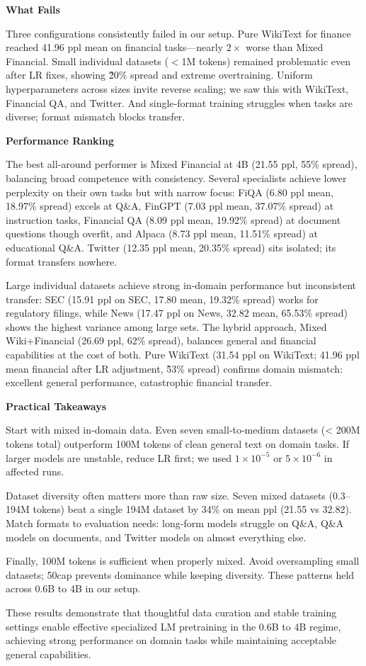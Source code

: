 \textbf{What Fails}

Three configurations consistently failed in our setup. Pure WikiText for finance reached 41.96 ppl mean on financial tasks—nearly $2\times$ worse than Mixed Financial. Small individual datasets ($<$1M tokens) remained problematic even after LR fixes, showing \~20\% spread and extreme overtraining. Uniform hyperparameters across sizes invite reverse scaling; we saw this with WikiText, Financial QA, and Twitter. And single‑format training struggles when tasks are diverse; format mismatch blocks transfer.

\textbf{Performance Ranking}

The best all‑around performer is Mixed Financial at 4B (21.55 ppl, 55\% spread), balancing broad competence with consistency. Several specialists achieve lower perplexity on their own tasks but with narrow focus: FiQA (6.80 ppl mean, 18.97\% spread) excels at Q\&A, FinGPT (7.03 ppl mean, 37.07\% spread) at instruction tasks, Financial QA (8.09 ppl mean, 19.92\% spread) at document questions though overfit, and Alpaca (8.73 ppl mean, 11.51\% spread) at educational Q\&A. Twitter (12.35 ppl mean, 20.35\% spread) sits isolated; its format transfers nowhere.

Large individual datasets achieve strong in‑domain performance but inconsistent transfer: SEC (15.91 ppl on SEC, 17.80 mean, 19.32\% spread) works for regulatory filings, while News (17.47 ppl on News, 32.82 mean, 65.53\% spread) shows the highest variance among large sets. The hybrid approach, Mixed Wiki+Financial (26.69 ppl, 62\% spread), balances general and financial capabilities at the cost of both. Pure WikiText (31.54 ppl on WikiText; 41.96 ppl mean financial after LR adjustment, \~53\% spread) confirms domain mismatch: excellent general performance, catastrophic financial transfer.

\textbf{Practical Takeaways}

Start with mixed in‑domain data. Even seven small‑to‑medium datasets (< 200M tokens total) outperform 100M tokens of clean general text on domain tasks. If larger models are unstable, reduce LR first; we used $1\times10^{-5}$ or $5\times10^{-6}$ in affected runs.

Dataset diversity often matters more than raw size. Seven mixed datasets (0.3–194M tokens) beat a single 194M dataset by 34\% on mean ppl (21.55 vs 32.82). Match formats to evaluation needs: long‑form models struggle on Q\&A, Q\&A models on documents, and Twitter models on almost everything else.

Finally, 100M tokens is sufficient when properly mixed. Avoid oversampling small datasets; 50cap prevents dominance while keeping diversity. These patterns held across 0.6B to 4B in our setup.

These results demonstrate that thoughtful data curation and stable training settings enable effective specialized LM pretraining in the 0.6B to 4B regime, achieving strong performance on domain tasks while maintaining acceptable general capabilities.
